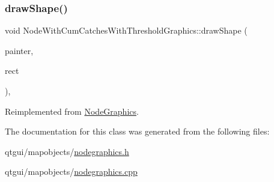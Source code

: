 \subsubsection{\texorpdfstring{drawShape()}{drawShape()}}
{\footnotesize\ttfamily void Node\+With\+Cum\+Catches\+With\+Threshold\+Graphics\+::draw\+Shape (\begin{DoxyParamCaption}\item[{Q\+Painter \&}]{painter,  }\item[{const qmapcontrol\+::\+Rect\+World\+Px \&}]{rect }\end{DoxyParamCaption})\hspace{0.3cm}{\ttfamily [protected]}, {\ttfamily [virtual]}}



Reimplemented from \mbox{\hyperlink{class_node_graphics_a6befa2f5ffc0c7efb4e56bc0c0aeff96}{Node\+Graphics}}.



The documentation for this class was generated from the following files\+:\begin{DoxyCompactItemize}
\item 
qtgui/mapobjects/\mbox{\hyperlink{nodegraphics_8h}{nodegraphics.\+h}}\item 
qtgui/mapobjects/\mbox{\hyperlink{nodegraphics_8cpp}{nodegraphics.\+cpp}}\end{DoxyCompactItemize}
